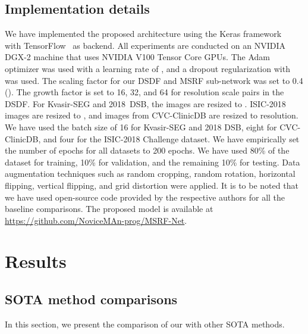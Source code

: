 \documentclass[journal,twoside,web]{IEEEtran}
\newcommand{\sysname}{\text{MSRF-Net}\xspace}
\begin{document}
\subsection{Implementation details}

We have implemented the proposed architecture using the Keras framework~\cite{chollet2015keras} with TensorFlow~\cite{abadi2016tensorflow} as backend. All experiments are conducted on an NVIDIA DGX-2 machine that uses NVIDIA V100 Tensor Core GPUs. The Adam optimizer was used with a learning rate of , and a dropout regularization with  was used. The scaling factor for our \ac{DSDF} and MSRF sub-network was set to 0.4 (). The growth factor  is set to 16, 32, and 64 for resolution scale pairs in the \ac{DSDF}. For Kvasir-SEG and 2018~\ac{DSB}, the images are resized to . ISIC-2018 images are resized to  , and images from CVC-ClinicDB are resized to  resolution. We have used the batch size of 16 for Kvasir-SEG and 2018 DSB, eight for CVC-ClinicDB, and four for the ISIC-2018 Challenge dataset. We have empirically set the number of epochs for all datasets to 200 epochs. We have used 80\% of the dataset for training, 10\% for validation, and the remaining 10\% for testing. Data augmentation techniques such as random cropping, random rotation, horizontal flipping, vertical flipping, and grid distortion were applied. It is to be noted that we have used open-source code provided by the respective authors for all the baseline comparisons. The proposed model is available at \href{https://github.com/NoviceMAn-prog/MSRF-Net}{https://github.com/NoviceMAn-prog/MSRF-Net}. 
\vspace{-3mm}


\section{Results}

\subsection{SOTA method comparisons}
In this section, we present the comparison of our \sysname with other \ac{SOTA} methods.
\end{document}
